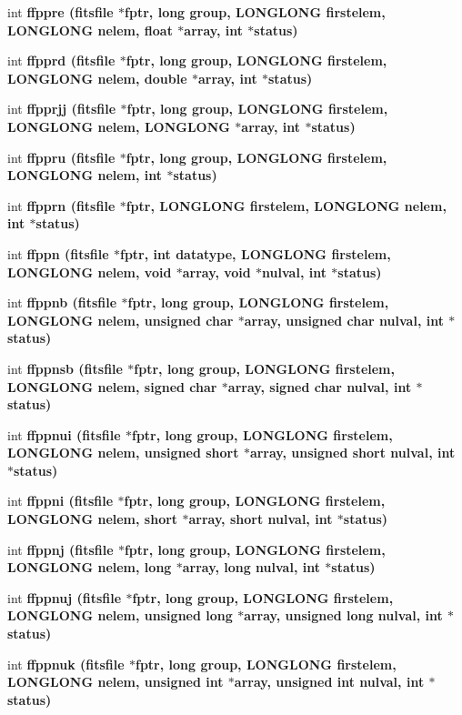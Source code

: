 \begin{CompactItemize}
\item 
int \bf{ffppre} (\bf{fitsfile} $\ast$fptr, long group, \bf{LONGLONG} firstelem, \bf{LONGLONG} nelem, float $\ast$array, int $\ast$status)
\item 
int \bf{ffpprd} (\bf{fitsfile} $\ast$fptr, long group, \bf{LONGLONG} firstelem, \bf{LONGLONG} nelem, double $\ast$array, int $\ast$status)
\item 
int \bf{ffpprjj} (\bf{fitsfile} $\ast$fptr, long group, \bf{LONGLONG} firstelem, \bf{LONGLONG} nelem, \bf{LONGLONG} $\ast$array, int $\ast$status)
\item 
int \bf{ffppru} (\bf{fitsfile} $\ast$fptr, long group, \bf{LONGLONG} firstelem, \bf{LONGLONG} nelem, int $\ast$status)
\item 
int \bf{ffpprn} (\bf{fitsfile} $\ast$fptr, \bf{LONGLONG} firstelem, \bf{LONGLONG} nelem, int $\ast$status)
\item 
int \bf{ffppn} (\bf{fitsfile} $\ast$fptr, int \bf{datatype}, \bf{LONGLONG} firstelem, \bf{LONGLONG} nelem, void $\ast$array, void $\ast$nulval, int $\ast$status)
\item 
int \bf{ffppnb} (\bf{fitsfile} $\ast$fptr, long group, \bf{LONGLONG} firstelem, \bf{LONGLONG} nelem, unsigned char $\ast$array, unsigned char nulval, int $\ast$status)
\item 
int \bf{ffppnsb} (\bf{fitsfile} $\ast$fptr, long group, \bf{LONGLONG} firstelem, \bf{LONGLONG} nelem, signed char $\ast$array, signed char nulval, int $\ast$status)
\item 
int \bf{ffppnui} (\bf{fitsfile} $\ast$fptr, long group, \bf{LONGLONG} firstelem, \bf{LONGLONG} nelem, unsigned short $\ast$array, unsigned short nulval, int $\ast$status)
\item 
int \bf{ffppni} (\bf{fitsfile} $\ast$fptr, long group, \bf{LONGLONG} firstelem, \bf{LONGLONG} nelem, short $\ast$array, short nulval, int $\ast$status)
\item 
int \bf{ffppnj} (\bf{fitsfile} $\ast$fptr, long group, \bf{LONGLONG} firstelem, \bf{LONGLONG} nelem, long $\ast$array, long nulval, int $\ast$status)
\item 
int \bf{ffppnuj} (\bf{fitsfile} $\ast$fptr, long group, \bf{LONGLONG} firstelem, \bf{LONGLONG} nelem, unsigned long $\ast$array, unsigned long nulval, int $\ast$status)
\item 
int \bf{ffppnuk} (\bf{fitsfile} $\ast$fptr, long group, \bf{LONGLONG} firstelem, \bf{LONGLONG} nelem, unsigned int $\ast$array, unsigned int nulval, int $\ast$status)
\item 

\end{CompactItemize}
